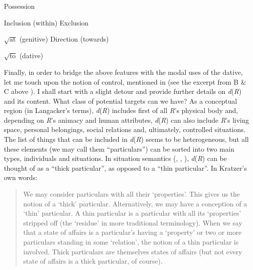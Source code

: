 \documentclass[output=paper,colorlinks,citecolor=brown]{./langscibook}
\begin{document}
\ea%
    \label{ex:tsedryk:28}
    \gll\\
        \\
    \glt
    \z

          Possession

  Inclusion (within)    Exclusion

   $\sqrt{\text{at}}$ (genitive)    Direction (towards)  

     $\sqrt{\text{to}}$ (dative)

Finally, in order to bridge the above features with the modal uses of the dative, let me touch upon the notion of control, mentioned in  (see the excerpt from B \& C above ). I shall start with a slight detour and provide further details on \textit{d}(\textit{R}) and its content. What class of potential targets can we have? As a conceptual region (in Langacker’s terms), \textit{d}(\textit{R}) includes first of all \textit{R}’s physical body and, depending on \textit{R}’s animacy and human attributes, \textit{d}(\textit{R}) can also include \textit{R}’s living space, personal belongings, social relations and, ultimately, controlled situations. The list of things that can be included in \textit{d}(\textit{R}) seems to be heterogeneous, but all these elements (we may call them “particulars”) can be sorted into two main types, individuals and situations. In situation semantics (\citealt{Kratzer1989}, \citeyear{Kratzer2002}, \citeyear{Kratzer2007}), \textit{d}(\textit{R}) can be thought of as a “thick particular”, as opposed to a “thin particular”. In Kratzer’s own words: 

\begin{quote}
We may consider particulars with all their ‘properties’. This gives us the notion of a ‘thick’ particular. Alternatively, we may have a conception of a ‘thin’ particular. A thin particular is a particular with all its ‘properties’ stripped off (the ‘residue’ in more traditional terminology). When we say that a state of affairs is a particular’s having a ‘property’ or two or more particulars standing in some ‘relation’, the notion of a thin particular is involved. Thick particulars are themselves states of affairs (but not every state of affairs is a thick particular, of course). \citep[613]{Kratzer1989} 
\end{quote}
\end{document}
